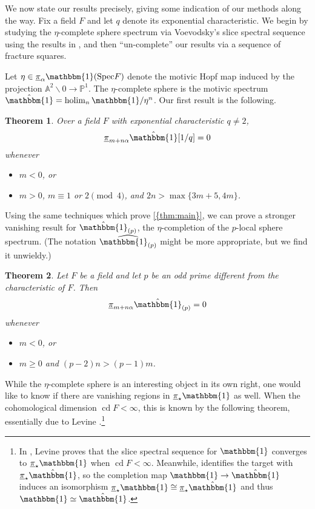 \documentclass[10pt]{amsart}
\numberwithin{equation}{section}
\theoremstyle{plain}
\newtheorem{theorem}[theorem]{Theorem}
\theoremstyle{definition}
\theoremstyle{remark}
\begin{document}
We now state our results precisely, giving some indication of our methods along the way.  Fix a field $F$ and let $q$ denote its exponential characteristic.  We begin by studying the $\eta$-complete sphere spectrum via Voevodsky's slice spectral sequence \cite{v:newopen} using the results in \cite{RSO:pi1}, and then ``un-complete'' our results via a sequence of fracture squares.

Let $\eta\in{\underline{\smash{\pi}}}_\alpha {\mathbbm{1}}({\operatorname{Spec}} F)$ denote the motivic Hopf map induced by the projection ${\mathbb{A}}^2\smallsetminus 0\to {\mathbb{P}}^1$.  The $\eta$-complete sphere is the motivic spectrum $\hat {\mathbbm{1}} = \operatorname*{\mathrm{holim}}_n {\mathbbm{1}}/\eta^n$.  Our first result is the following.

\begin{theorem}\label{thm:main}
Over a field $F$ with exponential characteristic $q\ne 2$,
\[
  {\underline{\smash{\pi}}}_{m+n\alpha}\hat {\mathbbm{1}}[1/q] = 0
\]
whenever
\begin{itemize}
\item $m<0$, or
\item $m>0$, $m\equiv 1$ or $2\pmod 4$, and $2n>\max\{3m+5,4m\}$.
\end{itemize}
\end{theorem}

Using the same techniques which prove {\autoref{{thm:main}}}, we can prove a stronger vanishing result for $\hat {\mathbbm{1}}_{(p)}$, the $\eta$-completion of the $p$-local sphere spectrum.  (The notation $\widehat{{\mathbbm{1}}_{(p)}}$ might be more appropriate, but we find it unwieldy.)

\begin{theorem}\label{thm:plocal}
Let $F$ be a field and let $p$ be an odd prime different from the characteristic of $F$.  Then
\[
  {\underline{\smash{\pi}}}_{m+n\alpha}\hat {\mathbbm{1}}_{(p)} = 0
\]
whenever
\begin{itemize}
\item $m<0$, or
\item $m\ge 0$ and $(p-2)n>(p-1)m$.
\end{itemize}
\end{theorem}

While the $\eta$-complete sphere is an interesting object in its own right, one would like to know if there are vanishing regions in ${\underline{\smash{\pi}}}_\star {\mathbbm{1}}$ as well.  When the cohomological dimension ${\operatorname{cd}} F <\infty$, this is known by the following theorem, essentially due to Levine \cite{Levine:convergence}.\footnote{In \cite{Levine:convergence}, Levine proves that the slice spectral sequence for ${\mathbbm{1}}$ converges to ${\underline{\smash{\pi}}}_\star{\mathbbm{1}}$ when ${\operatorname{cd}} F<\infty$.  Meanwhile, \cite[Theorem 3.50]{RSO:pi1} identifies the target with ${\underline{\smash{\pi}}}_\star\hat{\mathbbm{1}}$, so the completion map ${\mathbbm{1}}\to\hat{\mathbbm{1}}$ induces an isomorphism ${\underline{\smash{\pi}}}_\star{\mathbbm{1}}\cong {\underline{\smash{\pi}}}_\star\hat{\mathbbm{1}}$ and thus ${\mathbbm{1}} \simeq \hat{\mathbbm{1}}$.}
\end{document}
